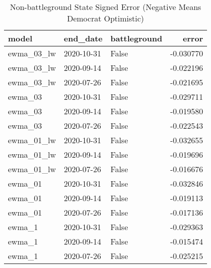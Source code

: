 \begin{table}
\centering
\caption{Non-battleground State Signed Error
(Negative Means Democrat Optimistic)}
\begin{tabular}{lllr}
\toprule
      model &    end\_date &  battleground &     error \\
\midrule
 ewma\_03\_lw &  2020-10-31 &         False & -0.030770 \\
 ewma\_03\_lw &  2020-09-14 &         False & -0.022196 \\
 ewma\_03\_lw &  2020-07-26 &         False & -0.021695 \\
    ewma\_03 &  2020-10-31 &         False & -0.029711 \\
    ewma\_03 &  2020-09-14 &         False & -0.019580 \\
    ewma\_03 &  2020-07-26 &         False & -0.022543 \\
 ewma\_01\_lw &  2020-10-31 &         False & -0.032655 \\
 ewma\_01\_lw &  2020-09-14 &         False & -0.019696 \\
 ewma\_01\_lw &  2020-07-26 &         False & -0.016676 \\
    ewma\_01 &  2020-10-31 &         False & -0.032846 \\
    ewma\_01 &  2020-09-14 &         False & -0.019113 \\
    ewma\_01 &  2020-07-26 &         False & -0.017136 \\
     ewma\_1 &  2020-10-31 &         False & -0.029363 \\
     ewma\_1 &  2020-09-14 &         False & -0.015474 \\
     ewma\_1 &  2020-07-26 &         False & -0.025215 \\
\bottomrule
\end{tabular}
\end{table}
